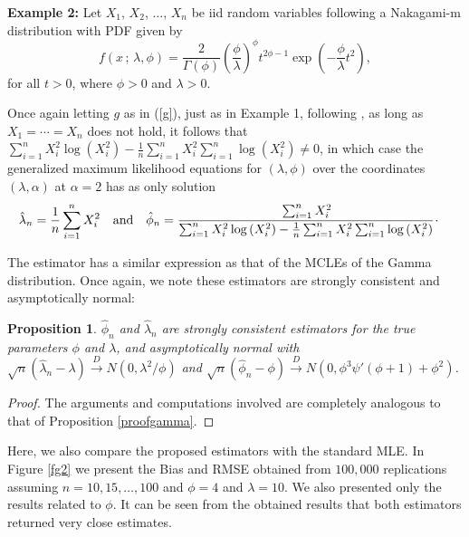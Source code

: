 \documentclass[10pt,a4paper,onecolumn]{article} %
\newtheorem{proposition}[theorem]{Proposition}
\begin{document}
\noindent\textbf{Example 2:} Let $X_1$, $X_2$, $\ldots$, $X_n$ be iid random variables following a Nakagami-m distribution with PDF given by
\begin{equation*}\label{fdpnk}
f(x\,;\,\lambda,\phi)=\frac{2}{\Gamma(\phi)}\left(\frac{\phi}{\lambda} \right)^\phi t^{2\phi-1}\exp\left(-\frac{\phi}{\lambda} t^2 \right), 
\end{equation*}
for all $t>0$, where $\phi> 0$ and $\lambda>0$.

Once again letting $g$ as in (\ref{g}), just as in Example 1, following \cite{ramos2020bias}, as long as $X_1=\cdots=X_n$ does not hold, it follows that $\sum_{i=1}^n X_i^2 \log\left(X_i^2\right) -\frac{1}{n}\sum_{i=1}^n X_i^2\sum_{i=1}^n \log\left(X_i^2\right)\neq 0$, in which case the generalized maximum likelihood equations for $(\lambda,\phi)$ over the coordinates $(\lambda,\alpha)$ at $\alpha=2$ has as only solution
\begin{equation*}\label{vinkom}
\begin{aligned}
&\hat\lambda_n=\frac{1}{n}\sum_{i=1}^n{X_i^2} \ \ \mbox{ and } \ \
\hat\phi_n=\cfrac{\sum_{i=1}^n X_i^{2}}{\sum_{i=1}^{n}X_i^{2} \log\left(X_i^2\right) - \frac{1}{n}\sum_{i=1}^n X_i^{2} \sum_{i=1}^n \log\left(X_i^2\right)} \, \cdot
\end{aligned}
\end{equation*}

The estimator has a similar expression as that of the MCLEs of the Gamma distribution. Once again, we note these estimators are strongly consistent and asymptotically normal:

\begin{proposition}\label{proofnakagami} $\hat\phi_n$ and $\hat\lambda_n$ are strongly consistent estimators for the true parameters $\phi$ and $\lambda$, and asymptotically normal with $\sqrt{n}\left(\hat{\lambda}_n-\lambda\right)\overset{D}{\to} N\left(0,\lambda^2/\phi\right)$ and $\sqrt{n}\left(\hat{\phi}_n-\phi\right)\overset{D}{\to} N\left(0,\phi^3\psi'(\phi+1)+\phi^2\right)$.
\end{proposition}
\begin{proof} The arguments and computations involved are completely analogous to that of Proposition \ref{proofgamma}.
\end{proof}

Here, we also compare the proposed estimators with the standard MLE. In Figure \ref{fg2} we present the Bias and RMSE obtained from $100,000$ replications assuming $n=10,15,\ldots,100$ and $\phi=4$ and $\lambda=10$. We also presented only the results related to $\phi$. It can be seen from the obtained results that both estimators returned very close estimates.
\end{document}
